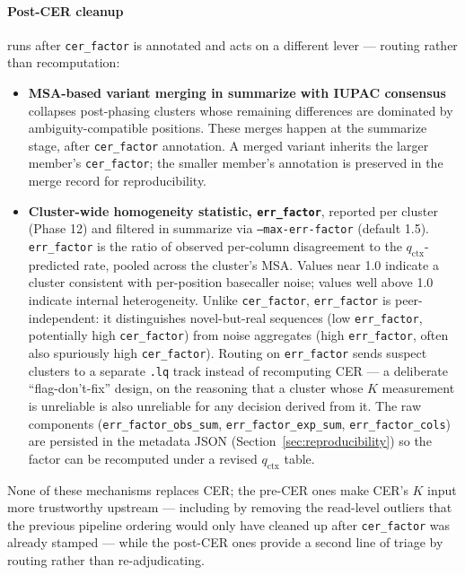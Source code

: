 \documentclass[11pt]{article}
\begin{document}
\paragraph{Post-CER cleanup} runs after \texttt{cer\_factor} is annotated
and acts on a different lever --- routing rather than recomputation:

\begin{itemize}
\item \textbf{MSA-based variant merging in summarize with IUPAC consensus}
collapses post-phasing clusters whose remaining differences are dominated
by ambiguity-compatible positions. These merges happen at the summarize
stage, after \texttt{cer\_factor} annotation. A merged variant inherits the
larger member's \texttt{cer\_factor}; the smaller member's annotation is
preserved in the merge record for reproducibility.

\item \textbf{Cluster-wide homogeneity statistic, \texttt{err\_factor}},
reported per cluster (Phase 12) and filtered in summarize via
\texttt{--max-err-factor} (default 1.5). \texttt{err\_factor} is the ratio
of observed per-column disagreement to the $q_\text{ctx}$-predicted rate,
pooled across the cluster's MSA. Values near 1.0 indicate a cluster
consistent with per-position basecaller noise; values well above 1.0
indicate internal heterogeneity. Unlike \texttt{cer\_factor},
\texttt{err\_factor} is peer-independent: it distinguishes novel-but-real
sequences (low \texttt{err\_factor}, potentially high \texttt{cer\_factor})
from noise aggregates (high \texttt{err\_factor}, often also spuriously
high \texttt{cer\_factor}). Routing on \texttt{err\_factor} sends suspect
clusters to a separate \texttt{.lq} track instead of recomputing CER --- a
deliberate ``flag-don't-fix'' design, on the reasoning that a cluster whose
$K$ measurement is unreliable is also unreliable for any decision derived
from it. The raw components (\texttt{err\_factor\_obs\_sum},
\texttt{err\_factor\_exp\_sum}, \texttt{err\_factor\_cols}) are persisted
in the metadata JSON (Section~\ref{sec:reproducibility}) so the factor can
be recomputed under a revised $q_\text{ctx}$ table.
\end{itemize}

None of these mechanisms replaces CER; the pre-CER ones make CER's $K$
input more trustworthy upstream --- including by removing the read-level
outliers that the previous pipeline ordering would only have cleaned up
after \texttt{cer\_factor} was already stamped --- while the post-CER ones
provide a second line of triage by routing rather than re-adjudicating.
\end{document}
